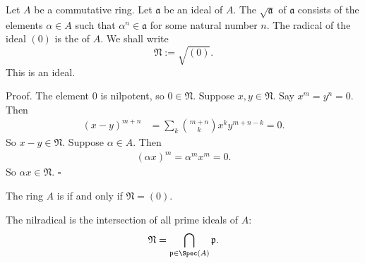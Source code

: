 \documentclass [preview, border = 20pt] {standalone}
\begin{document}
\pagecolor{black}
\color{white}
Let $A$ be a commutative ring. Let $\mathfrak a$ be an ideal of $A$. The  $\sqrt{\mathfrak a}$ of $\mathfrak a$ consists of the elements $\alpha\in A$ such that $\alpha^n \in \mathfrak a$ for some natural number $n$. The radical of the ideal $(0)$ is the  of $A$. We shall write
\[
\mathfrak N := \sqrt{(0)}.
\]
This is an ideal.

Proof. \quad
The element $0$ is nilpotent, so $0\in \mathfrak N$. Suppose $x,y\in \mathfrak N$. Say $x^m=y^n=0$. Then
\begin{align*}
(x-y)^{m+n} &= \sum_k \binom{m+n}{k}x^{k}y^{m+n-k}=0.
\end{align*}
So $x-y\in \mathfrak N$. Suppose $\alpha\in A$. Then 
\begin{align*}
(\alpha x)^m =\alpha^mx^m = 0.
\end{align*}
So $\alpha x\in \mathfrak N$.\hfill
$\square$

The ring $A$ is  if and only if $\mathfrak N = (0)$.

The nilradical is the intersection of all prime ideals of $A$:
\[
\mathfrak N = \bigcap_{\mathfrak p\in \Spec(A)} \mathfrak p.
\]
\end{document}
